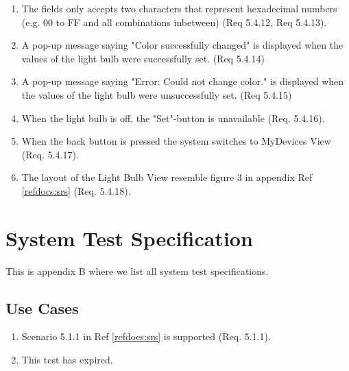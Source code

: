 \documentclass[a4paper]{article}
\newlength{\testlabellength}
\newenvironment{testlist}{\begin{enumerate}[label=\bfseries Test \thesubsection.\arabic* , labelindent=0pt, labelwidth=\testlabellength , leftmargin=2cm]}{\end{enumerate}}
\begin{document}
\begin{appendices}
\begin{testlist}
    \item The fields only accepts two characters that represent hexadecimal numbers (e.g. 00 to FF and all combinations inbetween) (Req 5.4.12, Req 5.4.13).
    
    \item A pop-up message saying "Color successfully changed" is displayed when the values of the light bulb were successfully set. (Req 5.4.14)
    
    \item A pop-up message saying "Error: Could not change color." is displayed when the values of the light bulb were unsuccessfully set. (Req 5.4.15)
    
    
    \item When the light bulb is off, the "Set"-button is unavailable (Req. 5.4.16).
    
    \item When the back button is pressed the system switches to MyDevices View (Req. 5.4.17).
    
    \item The layout of the Light Bulb View resemble figure 3 in appendix  Ref \ref{refdocs:srs} (Req. 5.4.18).

\end{testlist}	

\newpage

\section{System Test Specification} \label{appendix:section:systemtest}
This is appendix B where we list all system test specifications.

\subsection{Use Cases}
\begin{testlist}
	\item Scenario 5.1.1 in Ref \ref{refdocs:srs} is supported (Req. 5.1.1).

	\item This test has expired.
	

\end{testlist}
\end{appendices}
\end{document}
